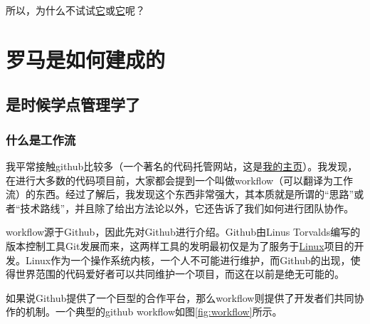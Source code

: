 \documentclass[UTF8]{ctexbook}
\begin{document}
所以，为什么不试试\href{https://zhuanlan.zhihu.com/p/20902898}{它}或\href{https://zhuanlan.zhihu.com/p/30970993}{它}呢？

\chapter{罗马是如何建成的}
\section{是时候学点管理学了}
\subsection{什么是工作流}
我平常接触github比较多（一个著名的代码托管网站，这是\href{https://github.com/lonelybag?tab=repositories}{我的主页}）。我发现，在进行大多数的代码项目前，大家都会提到一个叫做workflow（可以翻译为工作流）的东西。经过了解后，我发现这个东西非常强大，其本质就是所谓的“思路”或者“技术路线”，并且除了给出方法论以外，它还告诉了我们如何进行团队协作。

workflow源于Github，因此先对Github进行介绍。Github由Linus Torvalds编写的版本控制工具Git发展而来，这两样工具的发明最初仅是为了服务于\href{https://github.com/torvalds/linux}{Linux}项目的开发。Linux作为一个操作系统内核，一个人不可能进行维护，而Github的出现，使得世界范围的代码爱好者可以共同维护一个项目，而这在以前是绝无可能的。

如果说Github提供了一个巨型的合作平台，那么workflow则提供了开发者们共同协作的机制。一个典型的github workflow如图\ref{fig:workflow}所示。
\end{document}
